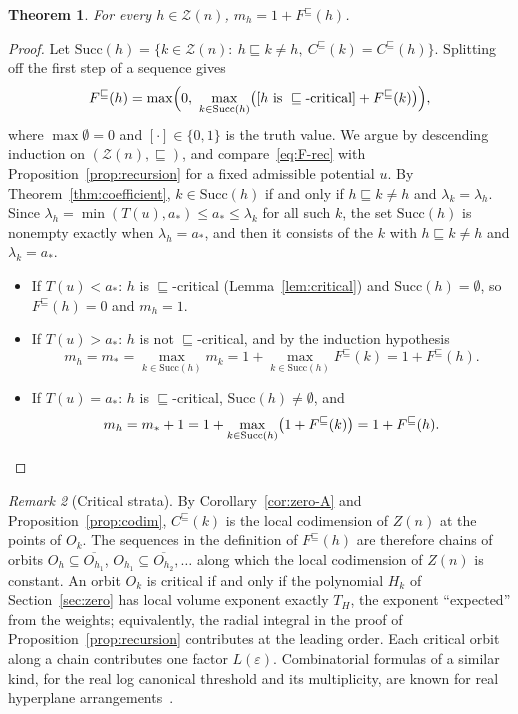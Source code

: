 \documentclass[11pt,a4paper]{article}
\newtheorem{theorem}{Theorem}[section]
\theoremstyle{definition}
\theoremstyle{remark}
\newtheorem{remark}[theorem]{Remark}
\numberwithin{equation}{section}
\newcommand{\eps}{\varepsilon}
\newcommand{\Zb}{\mathcal Z}
\begin{document}
\begin{theorem}\label{thm:mult}
For every $h\in\Zb(n)$, $m_h=1+F^\sqsubseteq(h)$.
\end{theorem}
\begin{proof}
Let $\mathrm{Succ}(h)=\{k\in\Zb(n):\ h\sqsubseteq k\neq h,\ C^\sqsubseteq(k)=C^\sqsubseteq(h)\}$. Splitting off the first step of a sequence gives
\begin{equation}\label{eq:F-rec}
F^\sqsubseteq(h)=\max\Bigl(0,\ \max_{k\in\mathrm{Succ}(h)}\bigl([h\text{ is }\sqsubseteq\text{-critical}]+F^\sqsubseteq(k)\bigr)\Bigr),
\end{equation}
where $\max\emptyset=0$ and $[\cdot]\in\{0,1\}$ is the truth value. We argue by descending induction on $(\Zb(n),\sqsubseteq)$, and compare~\eqref{eq:F-rec} with Proposition~\ref{prop:recursion} for a fixed admissible potential $u$. By Theorem~\ref{thm:coefficient}, $k\in\mathrm{Succ}(h)$ if and only if $h\sqsubseteq k\neq h$ and $\lambda_k=\lambda_h$. Since $\lambda_h=\min(T(u),a_*)\le a_*\le\lambda_k$ for all such $k$, the set $\mathrm{Succ}(h)$ is nonempty exactly when $\lambda_h=a_*$, and then it consists of the $k$ with $h\sqsubseteq k\neq h$ and $\lambda_k=a_*$.
\begin{itemize}
\item If $T(u)<a_*$: $h$ is $\sqsubseteq$-critical (Lemma~\ref{lem:critical}) and $\mathrm{Succ}(h)=\emptyset$, so $F^\sqsubseteq(h)=0$ and $m_h=1$.
\item If $T(u)>a_*$: $h$ is not $\sqsubseteq$-critical, and by the induction hypothesis
\[
m_h=m_*=\max_{k\in\mathrm{Succ}(h)}m_k=1+\max_{k\in\mathrm{Succ}(h)}F^\sqsubseteq(k)=1+F^\sqsubseteq(h).
\]
\item If $T(u)=a_*$: $h$ is $\sqsubseteq$-critical, $\mathrm{Succ}(h)\neq\emptyset$, and
\[
m_h=m_*+1=1+\max_{k\in\mathrm{Succ}(h)}\bigl(1+F^\sqsubseteq(k)\bigr)=1+F^\sqsubseteq(h).\qedhere
\]
\end{itemize}
\end{proof}

\begin{remark}[Critical strata]\label{rem:critical-geom}
By Corollary~\ref{cor:zero-A} and Proposition~\ref{prop:codim}, $C^\sqsubseteq(k)$ is the local codimension of $Z(n)$ at the points of $O_k$. The sequences in the definition of $F^\sqsubseteq(h)$ are therefore chains of orbits $O_h\subseteq\overline{O_{h_1}}$, $O_{h_1}\subseteq\overline{O_{h_2}},\dots$ along which the local codimension of $Z(n)$ is constant. An orbit $O_k$ is critical if and only if the polynomial $H_k$ of Section~\ref{sec:zero} has local volume exponent exactly $T_H$, the exponent ``expected'' from the weights; equivalently, the radial integral in the proof of Proposition~\ref{prop:recursion} contributes at the leading order. Each critical orbit along a chain contributes one factor $L(\eps)$. Combinatorial formulas of a similar kind, for the real log canonical threshold and its multiplicity, are known for real hyperplane arrangements~\cite{kosta-windisch}.
\end{remark}
\end{document}
